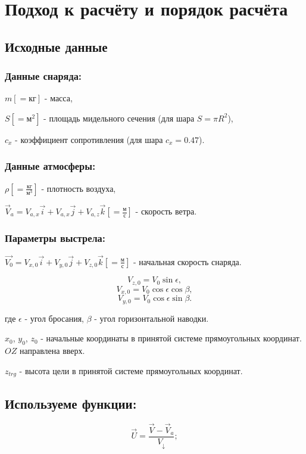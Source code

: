 \section{Подход к расчёту и порядок расчёта}

\subsection{Исходные данные}


\subsubsection{Данные снаряда:}

$m [=\mbox{кг}]$ - масса,

$S [=\mbox{м}^2]$ - площадь мидельного сечения (для шара $S = \pi R^2$),

$c_x$ - коэффициент сопротивления (для шара $c_x = 0.47$).

\subsubsection{Данные атмосферы:}

$\rho [=\frac{\mbox{кг}}{\mbox{м}^3}]$ - плотность воздуха, 

$\vec{V}_{a} = V_{a,x}\vec{i} + V_{a,x}\vec{j} + V_{a,z}\vec{k} [=\frac{\mbox{м}}{\mbox{с}}]$ - скорость ветра.

\subsubsection{Параметры выстрела:}

$\vec{V_0} = V_{x,0}\vec{i} + V_{y,0}\vec{j} + V_{z,0}\vec{k} [=\frac{\mbox{м}}{\mbox{с}}]$ - начальная скорость снаряда.

$$V_{z,0} = V_0 \sin{\epsilon},$$
$$V_{x,0} = V_0 \cos{\epsilon} \cos{\beta},$$
$$V_{y,0} = V_0 \cos{\epsilon} \sin{\beta}.$$


где $\epsilon$ - угол бросания, $\beta$ - угол горизонтальной наводки.

$x_0$, $y_0$, $z_0$ - начальные координаты в принятой системе прямоугольных координат. $OZ$ направлена вверх.

$z_{trg}$ - высота цели в принятой системе прямоугольных координат.

\subsection{Используеме функции:}
$$\vec{U} = \frac{\vec{V}-\vec{V}_a}{V_\downarrow};$$


